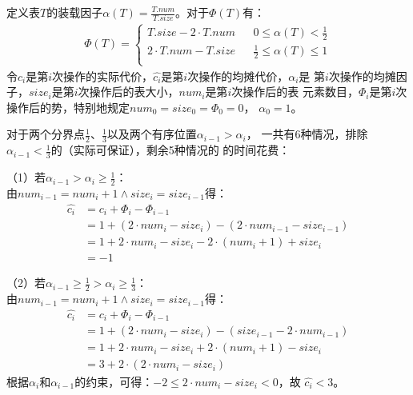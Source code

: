 \begin{solution}
    定义表$T$的装载因子$\alpha(T)=\frac{T.num}{T.size}$。对于$\Phi(T)$有：
    \begin{align*}
        \Phi(T)=\left\{
        \begin{array}{rcl}
        T.size - 2\cdot T.num & & {0 \le \alpha(T) < \frac{1}{2}}\\
        2\cdot T.num - T.size & & {\frac{1}{2} \le \alpha(T) \le 1}\\
        \end{array} \right.
    \end{align*}
    令$c_i$是第$i$次操作的实际代价，$\hat{c_i}$是第$i$次操作的均摊代价，$\alpha_i$是
    第$i$次操作的均摊因子，$size_i$是第$i$次操作后的表大小，$num_i$是第$i$次操作后的表
    元素数目，$\Phi_i$是第$i$次操作后的势，特别地规定$num_0 = size_0 = \Phi_0 = 0$，
    $\alpha_0 = 1$。

    对于两个分界点$\frac{1}{2}$、$\frac{1}{3}$以及两个有序位置$\alpha_{i-1} > \alpha_i$，
    一共有6种情况，排除$\alpha_{i-1}<\frac{1}{3}$的（实际可保证），剩余5种情况的
    的时间花费：

    （1）若$\alpha_{i-1} > \alpha_i \ge \frac{1}{2}$：\\
    由$num_{i-1}=num_i+1 \wedge size_i = size_{i-1}$得：
    \begin{align*}
        \hat{c_i} &= c_i + \Phi_i - \Phi_{i-1}\\
        &= 1 + (2\cdot num_{i}-size_{i}) - (2 \cdot num_{i-1}-size_{i-1})\\
        &= 1 + 2\cdot num_i -size_i - 2\cdot(num_i + 1) + size_i\\
        &= -1
    \end{align*}

    （2）若$\alpha_{i-1} \ge \frac{1}{2} > \alpha_i \ge \frac{1}{3}$：\\
    由$num_{i-1}=num_i+1 \wedge size_i = size_{i-1}$得：
    \begin{align*}
        \hat{c_i} &= c_i + \Phi_i - \Phi_{i-1}\\
        &= 1 + (2\cdot num_{i} - size_{i}) - (size_{i-1} - 2 \cdot num_{i-1})\\
        &= 1 + 2\cdot num_i - size_i + 2\cdot(num_i + 1) - size_i\\
        &= 3 + 2\cdot (2\cdot num_i - size_i)
    \end{align*}
    根据$\alpha_i$和$\alpha_{i-1}$的约束，可得：$-2 \le 2\cdot num_i - size_i < 0$，故
    $\hat{c_i}<3$。


\end{solution}
